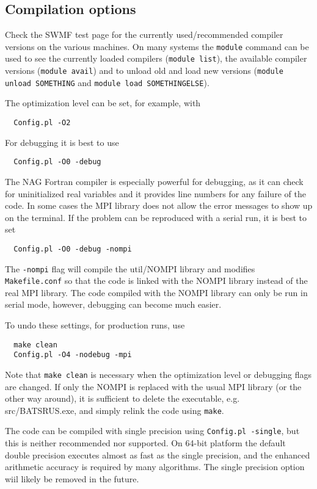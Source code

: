 \subsection{Compilation options}

Check the SWMF test page for the currently used/recommended 
compiler versions on the various machines. On many systems the
{\tt module} command can be used to see the currently loaded
compilers ({\tt module list}), the available compiler versions
({\tt module avail}) and to unload old and load new versions
({\tt module unload SOMETHING} and {\tt module load SOMETHINGELSE}).

The optimization level can be set, for example, with
\begin{verbatim}
  Config.pl -O2
\end{verbatim}
For debugging it is best to use
\begin{verbatim}
  Config.pl -O0 -debug
\end{verbatim}
The NAG Fortran compiler is especially powerful for debugging, 
as it can check for uninitialized real variables and it provides 
line numbers for any failure of the code.
In some cases the MPI library does not allow the error messages to show up
on the terminal. If the problem can be reproduced with a serial run, 
it is best to set
\begin{verbatim}
  Config.pl -O0 -debug -nompi
\end{verbatim}
The {\tt -nompi} flag will compile the util/NOMPI library and 
modifies {\tt Makefile.conf} so that the code is linked with
the NOMPI library instead of the real MPI library. 
The code compiled with the NOMPI library can only be
run in serial mode, however, debugging can become much easier.

To undo these settings, for production runs, use 
\begin{verbatim}
  make clean
  Config.pl -O4 -nodebug -mpi
\end{verbatim}
Note that {\tt make clean} is necessary when the optimization level 
or debugging flags are changed. If only the NOMPI is replaced with 
the usual MPI library (or the other way around), it is sufficient to
delete the executable, e.g. src/BATSRUS.exe, and simply relink the code
using {\tt make}.

The code can be compiled with single precision using {\tt Config.pl -single},
but this is neither recommended nor supported. On 64-bit platform the default
double precision executes almost as fast as the single precision, and the 
enhanced arithmetic accuracy is required by many algorithms.  
The single precision option wiil likely be removed in the future.

